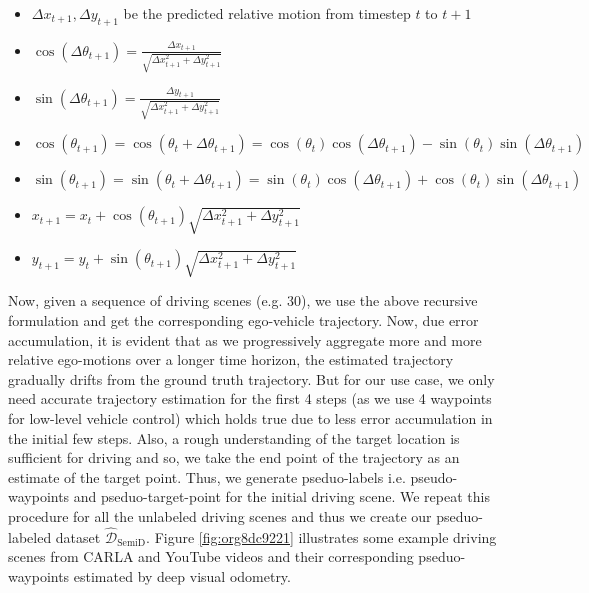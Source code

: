 \documentclass[letterpaper, 12pt]{book}
\theoremstyle{definition}
\theoremstyle{definition}
\theoremstyle{definition}
\theoremstyle{definition}
\theoremstyle{definition}
\begin{document}
\begin{itemize}
\item \(\Delta x_{t+1}, \Delta y_{t+1}\) be the predicted relative motion from timestep
\(t\) to \(t+1\)
\item \(\cos(\Delta\theta_{t+1}) = \frac{\Delta x_{t+1}}{\sqrt{\Delta x_{t+1}^{2}+\Delta y_{t+1}^{2}}}\)
\item \(\sin(\Delta\theta_{t+1}) = \frac{\Delta y_{t+1}}{\sqrt{\Delta x_{t+1}^{2}+\Delta y_{t+1}^{2}}}\)
\item \(\cos(\theta_{t+1}) = \cos(\theta_{t}+\Delta \theta_{t+1}) =
  \cos(\theta_{t})\cos(\Delta\theta_{t+1})-\sin(\theta_{t})\sin(\Delta\theta_{t+1})\)
\item \(\sin(\theta_{t+1}) = \sin(\theta_{t}+\Delta \theta_{t+1})=
  \sin(\theta_{t})\cos(\Delta\theta_{t+1})+\cos(\theta_{t})\sin(\Delta\theta_{t+1})\)
\item \(x_{t+1} = x_{t} + \cos(\theta_{t+1})\sqrt{\Delta x_{t+1}^{2}+\Delta y_{t+1}^{2}}\)
\item \(y_{t+1} = y_{t} + \sin(\theta_{t+1})\sqrt{\Delta x_{t+1}^{2}+\Delta y_{t+1}^{2}}\)
\end{itemize}

Now, given a sequence of driving scenes (e.g. 30), we use the above recursive
formulation and get the corresponding ego-vehicle trajectory. Now, due error
accumulation, it is evident that as we progressively aggregate more and more
relative ego-motions over a longer time horizon, the estimated trajectory
gradually drifts from the ground truth trajectory. But for our use case, we only
need accurate trajectory estimation for the first 4 steps (as we use 4 waypoints
for low-level vehicle control) which holds true due to less error accumulation
in the initial few steps. Also, a rough understanding of the target location is
sufficient for driving and so, we take the end point of the trajectory as an
estimate of the target point. Thus, we generate pseduo-labels
i.e. pseudo-waypoints and pseduo-target-point for the initial driving scene. We
repeat this procedure for all the unlabeled driving scenes and thus we create
our pseduo-labeled dataset \(\hat{\mathcal{D}}_{\text{SemiD}}\). Figure \ref{fig:org8dc9221}
illustrates some example driving scenes from CARLA and YouTube videos and their
corresponding pseduo-waypoints estimated by deep visual odometry.
\end{document}
